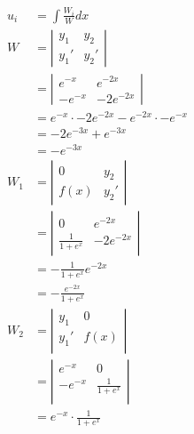 \documentclass{zc-ust-hw}
\begin{document}
\begin{enumerate}
\begin{enumerate}
\begin{sol}
\begin{align}
                u_{i} &= \int \frac{W_{i}}{W} dx \\
                W &= \left| \begin{array}{cc}
                  y_{1}&y_{2} \\
                  y_{1}' & y_{2}'
                \end{array} \right|  \\
                  &= \left| \begin{array}{cc}
                    e^{-x} & e^{-2x} \\
                    -e^{-x} & -2e^{-2x}
                  \end{array} \right|  \\
                  &= e^{-x}\cdot -2e^{-2x}-e^{-2x}\cdot -e^{-x} \\
                  &= -2e^{-3x}+e^{-3x} \\
                  &= -e^{-3x} \\
                W_{1} &= \left| \begin{array}{cc}
                  0&y_{2} \\
                  f(x) & y_{2}'
                \end{array} \right|  \\
                &= \left| \begin{array}{cc}
                  0&e^{-2x} \\
                  \frac{1}{1+e^{x} } & -2e^{-2x}
                \end{array} \right|  \\
                &= -\frac{1}{1+e^{x} }e^{-2x} \\
                &= -\frac{e^{-2x}}{1+e^{x} } \\
                W_{2} &= \left| \begin{array}{cc}
                  y_{1}&0\\
                  y_{1}'&f(x)\\
                \end{array} \right| \\
                &= \left| \begin{array}{cc}
                  e^{-x}&0\\
                  -e^{-x}&\frac{1}{1+e^{x} }\\
                \end{array} \right| \\
                &= e^{-x}\cdot \frac{1}{1+e^{x} } \\

\end{align}
\end{sol}
\end{enumerate}
\end{enumerate}
\end{document}
